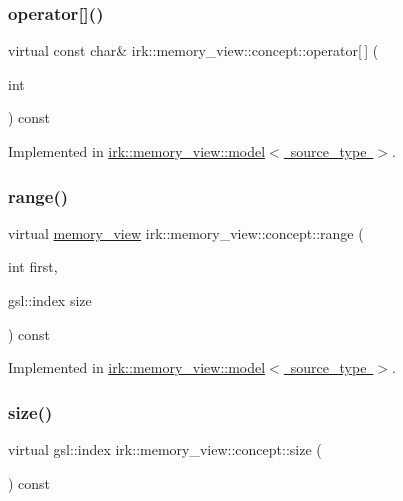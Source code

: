 \subsubsection{\texorpdfstring{operator[]()}{operator[]()}}
{\footnotesize\ttfamily virtual const char\& irk\+::memory\+\_\+view\+::concept\+::operator\mbox{[}$\,$\mbox{]} (\begin{DoxyParamCaption}\item[{int}]{ }\end{DoxyParamCaption}) const\hspace{0.3cm}{\ttfamily [pure virtual]}}



Implemented in \mbox{\hyperlink{classirk_1_1memory__view_1_1model_aa1e6d7c44b66f54ee9c94abeba0449c2}{irk\+::memory\+\_\+view\+::model$<$ source\+\_\+type $>$}}.

\mbox{\label{structirk_1_1memory__view_1_1concept_a65c761925c104cfd049dc5de3d800f37}} 
\subsubsection{\texorpdfstring{range()}{range()}}
{\footnotesize\ttfamily virtual \mbox{\hyperlink{classirk_1_1memory__view}{memory\+\_\+view}} irk\+::memory\+\_\+view\+::concept\+::range (\begin{DoxyParamCaption}\item[{int}]{first,  }\item[{gsl\+::index}]{size }\end{DoxyParamCaption}) const\hspace{0.3cm}{\ttfamily [pure virtual]}}



Implemented in \mbox{\hyperlink{classirk_1_1memory__view_1_1model_ab1332728617a8e4a8f719c6fe380e100}{irk\+::memory\+\_\+view\+::model$<$ source\+\_\+type $>$}}.

\mbox{\label{structirk_1_1memory__view_1_1concept_ae280e124e776a61562f6a97b2fa7d655}} 
\subsubsection{\texorpdfstring{size()}{size()}}
{\footnotesize\ttfamily virtual gsl\+::index irk\+::memory\+\_\+view\+::concept\+::size (\begin{DoxyParamCaption}{ }\end{DoxyParamCaption}) const\hspace{0.3cm}{\ttfamily [pure virtual]}}



